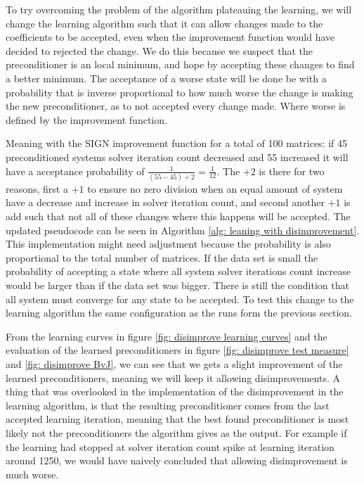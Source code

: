 To try overcoming the problem of the algorithm plateauing the learning, we will change the learning algorithm such that it can allow changes made to the coefficients to be accepted, even when the improvement function would have decided to rejected the change. We do this because we suspect that the preconditioner is an local minimum, and hope by accepting these changes to find a better minimum. The acceptance of a worse state will be done be with a probability that is inverse proportional to how much worse the change is making the new preconditioner, as to not accepted every change made. Where worse is defined by the improvement function.

Meaning with the SIGN improvement function for a total of 100 matrices: if 45 preconditioned systems solver iteration count decreased and 55 increased it will have a acceptance probability of \(\frac{1}{(55-45)+2}=\frac{1}{12}\). The \(+2\) is there for two reasons, first a \(+1\) to ensure no zero division when an equal amount of system have a decrease and increase in solver iteration count, and second another \(+1\) is add such that not all of these changes where this happens will be accepted. The updated pseudocode can be seen in Algorithm \ref{alg: leaning with disimprovement}. This implementation might need adjustment because the probability is also proportional to the total number of matrices. If the data set is small the probability of accepting a state where all system solver iterations count increase would be larger than if the data set was bigger. There is still the condition that all system must converge for any state to be accepted. To test this change to the learning algorithm the same configuration as the runs form the previous section.

From the learning curves in figure \ref{fig: disimprove learning curves} and the evaluation of the learned preconditioners in figure \ref{fig: disimprove test measure} and \ref{fig: disimprove BvJ}, we can see that we gets a slight improvement of the learned preconditioners, meaning we will keep it allowing disimprovements. A thing that was overlooked in the implementation of the disimprovement in the learning algorithm, is that the resulting preconditioner comes from the last accepted learning iteration, meaning that the best found preconditioner is most likely not the preconditioners the algorithm gives as the output. For example if the learning had stopped at solver iteration count spike at learning iteration around 1250, we would have naively concluded that allowing disimprovement is much worse.


